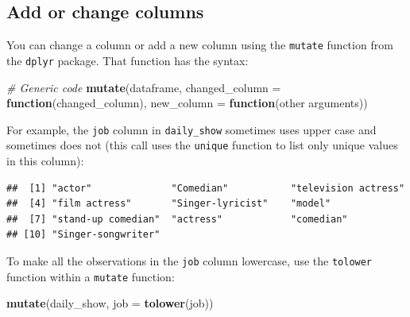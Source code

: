 \documentclass[]{book}
\makeatletter
\newenvironment{Shaded}{\begin{snugshade}}{\end{snugshade}}
\newcommand{\KeywordTok}[1]{\textcolor[rgb]{0.13,0.29,0.53}{\textbf{#1}}}
\newcommand{\DataTypeTok}[1]{\textcolor[rgb]{0.13,0.29,0.53}{#1}}
\newcommand{\DecValTok}[1]{\textcolor[rgb]{0.00,0.00,0.81}{#1}}
\newcommand{\CommentTok}[1]{\textcolor[rgb]{0.56,0.35,0.01}{\textit{#1}}}
\newcommand{\ControlFlowTok}[1]{\textcolor[rgb]{0.13,0.29,0.53}{\textbf{#1}}}
\newcommand{\OperatorTok}[1]{\textcolor[rgb]{0.81,0.36,0.00}{\textbf{#1}}}
\newcommand{\NormalTok}[1]{#1}
\newenvironment{kframe}{%
\medskip{}
\setlength{\fboxsep}{.8em}
 \def\at@end@of@kframe{}%
 \ifinner\ifhmode%
  \def\at@end@of@kframe{\end{minipage}}%
  \begin{minipage}{\columnwidth}%
 \fi\fi%
 \def\FrameCommand##1{\hskip\@totalleftmargin \hskip-\fboxsep
 \colorbox{shadecolor}{##1}\hskip-\fboxsep
     \hskip-\linewidth \hskip-\@totalleftmargin \hskip\columnwidth}%
 \MakeFramed {\advance\hsize-\width
   \@totalleftmargin\z@ \linewidth\hsize
   \@setminipage}}%
 {\par\unskip\endMakeFramed%
 \at@end@of@kframe}
\renewenvironment{Shaded}{\begin{kframe}}{\end{kframe}}
\theoremstyle{definition}
\theoremstyle{definition}
\theoremstyle{definition}
\theoremstyle{remark}
\makeatother
\begin{document}
\subsection{Add or change columns}\label{add-or-change-columns}

You can change a column or add a new column using the \texttt{mutate}
function from the \texttt{dplyr} package. That function has the syntax:

\begin{Shaded}
\begin{Highlighting}[]
\CommentTok{# Generic code}
\KeywordTok{mutate}\NormalTok{(dataframe,}
       \DataTypeTok{changed_column =} \ControlFlowTok{function}\NormalTok{(changed_column),}
       \DataTypeTok{new_column =} \ControlFlowTok{function}\NormalTok{(other arguments))}
\end{Highlighting}
\end{Shaded}

For example, the \texttt{job} column in \texttt{daily\_show} sometimes
uses upper case and sometimes does not (this call uses the
\texttt{unique} function to list only unique values in this column):

\begin{Shaded}
\end{Shaded}

\begin{verbatim}
##  [1] "actor"              "Comedian"           "television actress"
##  [4] "film actress"       "Singer-lyricist"    "model"             
##  [7] "stand-up comedian"  "actress"            "comedian"          
## [10] "Singer-songwriter"
\end{verbatim}

To make all the observations in the \texttt{job} column lowercase, use
the \texttt{tolower} function within a \texttt{mutate} function:

\begin{Shaded}
\begin{Highlighting}[]
\KeywordTok{mutate}\NormalTok{(daily_show, }\DataTypeTok{job =} \KeywordTok{tolower}\NormalTok{(job))}
\end{Highlighting}
\end{Shaded}
\end{document}
